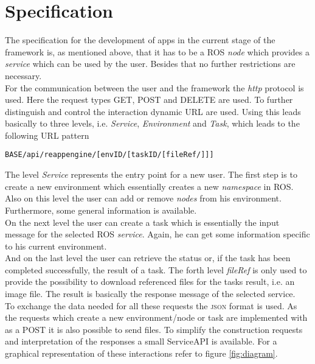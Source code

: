 \documentclass[10pt,a4paper]{article}
\begin{document}
	\section*{Specification}
		The specification for the development of apps in the current stage of the framework is, as
		mentioned above, that it has to be a \textsc{ROS} \emph{node} which provides a
		\emph{service} which can be used by the user. Besides that no further restrictions are
		necessary. \\
		For the communication between the user and the framework the \emph{http} protocol is used.
		Here the request types \textsc{GET}, \textsc{POST} and \textsc{DELETE} are used. To further
		distinguish and control the interaction dynamic URL are used. Using this leads basically to
		three levels, i.e. \emph{Service}, \emph{Environment} and \emph{Task}, which leads to the
		following URL pattern
		\begin{lstlisting}
BASE/api/reappengine/[envID/[taskID/[fileRef/]]]
		\end{lstlisting}
		The level \emph{Service} represents the entry point for a new user. The first step is to
		create a new environment which essentially creates a new \emph{namespace} in \textsc{ROS}.
		Also on this level the user can add or remove \emph{nodes} from his environment.
		Furthermore, some general information is available. \\
		On the next level the user can create a task which is essentially the input message for
		the selected \textsc{ROS} \emph{service}. Again, he can get some information specific to
		his current environment. \\
		And on the last level the user can retrieve the status or, if the task has been completed
		successfully, the result of a task. The forth level \emph{fileRef} is only used to provide
		the possibility to download referenced files for the tasks result, i.e. an image file. The
		result is basically the response message of the selected service. \\
		To exchange the data needed for all these requests the \textsc{json} format is used. As
		the requests which create a new environment/node or task are implemented with as a
		\textsc{POST} it is also possible to send files. To simplify the construction requests and
		interpretation of the responses a small ServiceAPI is available. For a graphical
		representation of these interactions refer to figure \ref{fig:diagram}. 
		
\end{document}
